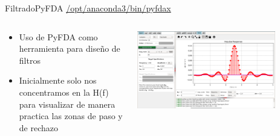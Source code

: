 \begin{frame}[t]{Filtrado}{PyFDA \href{/opt/anaconda3/bin/pyfdax}{/opt/anaconda3/bin/pyfdax}}
   \begin{columns}[t]
      \footnotesize
      \begin{column}{.4\textwidth}
         \begin{itemize}
            \item{Uso de PyFDA como herramienta para diseño de filtros}
            \item{Inicialmente solo nos concentramos en la H(f) para visualizar de manera practica las zonas de paso y de rechazo}
         \end{itemize}
      \end{column}
      \hspace{2pt}
      \vrule
      \hspace{2pt}
      \begin{column}{.6\textwidth}
         \center\includegraphics[width=0.80\textwidth]{5_clase/pyfda1}
      \end{column}
      \hspace{2pt}
   \end{columns}
   \vfill
\end{frame}
